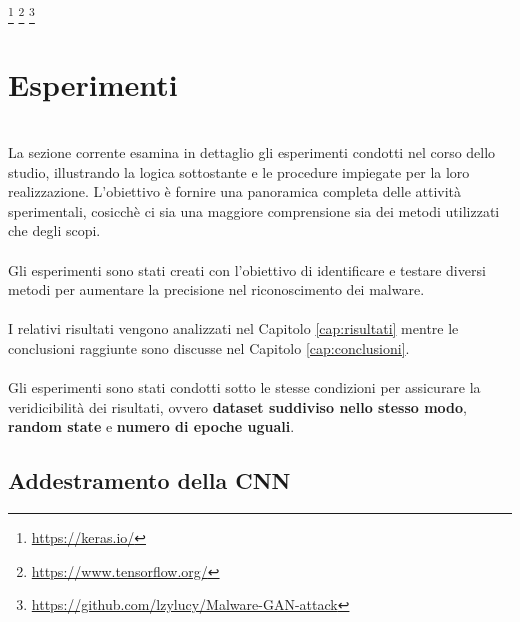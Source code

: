 \footnote{\url{https://keras.io/}}
\footnote{\url{https://www.tensorflow.org/}}
\footnote{\url{https://github.com/lzylucy/Malware-GAN-attack}}


\section{Esperimenti}
~\\
\indent La sezione corrente esamina in dettaglio gli esperimenti condotti nel corso dello studio, illustrando la logica sottostante e le procedure impiegate per la loro realizzazione. 
L'obiettivo è fornire una panoramica completa delle attività sperimentali, cosicchè ci sia una maggiore comprensione sia dei metodi utilizzati che degli scopi.
\\\\
Gli esperimenti sono stati creati con l'obiettivo di identificare e testare diversi metodi per aumentare la precisione nel riconoscimento dei malware.
\\\\
I relativi risultati vengono analizzati nel Capitolo \ref{cap:risultati} mentre le conclusioni raggiunte sono discusse nel Capitolo \ref{cap:conclusioni}.
\\\\
Gli esperimenti sono stati condotti sotto le stesse condizioni per assicurare la veridicibilità dei risultati, ovvero \textbf{dataset suddiviso nello stesso modo}, \textbf{random state} e \textbf{numero di epoche uguali}. 


\subsection{Addestramento della CNN}

